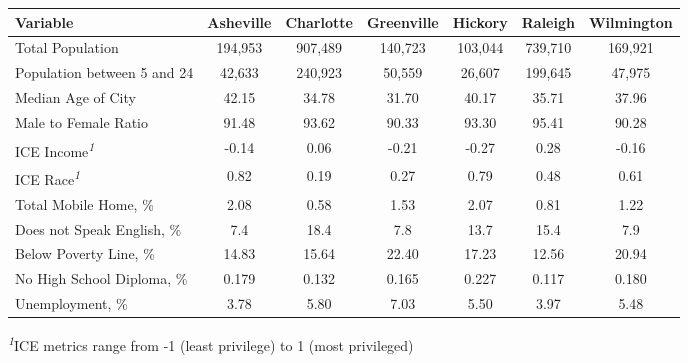 \setlength{\LTpost}{0mm}
\begin{longtable}{lcccccc}
\toprule
\textbf{Variable} & \textbf{Asheville} & \textbf{Charlotte} & \textbf{Greenville} & \textbf{Hickory} & \textbf{Raleigh} & \textbf{Wilmington} \\ 
\midrule
Total Population & 194,953 & 907,489 & 140,723 & 103,044 & 739,710 & 169,921 \\ 
Population between 5 and 24 & 42,633 & 240,923 & 50,559 & 26,607 & 199,645 & 47,975 \\ 
Median Age of City & 42.15 & 34.78 & 31.70 & 40.17 & 35.71 & 37.96 \\ 
Male to Female Ratio & 91.48 & 93.62 & 90.33 & 93.30 & 95.41 & 90.28 \\ 
ICE Income\textsuperscript{\textit{1}} & -0.14 & 0.06 & -0.21 & -0.27 & 0.28 & -0.16 \\ 
ICE Race\textsuperscript{\textit{1}} & 0.82 & 0.19 & 0.27 & 0.79 & 0.48 & 0.61 \\ 
Total Mobile Home, \% & 2.08 & 0.58 & 1.53 & 2.07 & 0.81 & 1.22 \\ 
Does not Speak English, \% & 7.4 & 18.4 & 7.8 & 13.7 & 15.4 & 7.9 \\ 
Below Poverty Line, \% & 14.83 & 15.64 & 22.40 & 17.23 & 12.56 & 20.94 \\ 
No High School Diploma, \% & 0.179 & 0.132 & 0.165 & 0.227 & 0.117 & 0.180 \\ 
Unemployment, \% & 3.78 & 5.80 & 7.03 & 5.50 & 3.97 & 5.48 \\ 
\bottomrule
\end{longtable}
\begin{minipage}{\linewidth}
\textsuperscript{\textit{1}}ICE metrics range from -1 (least privilege) to 1 (most privileged)\\
\end{minipage}

